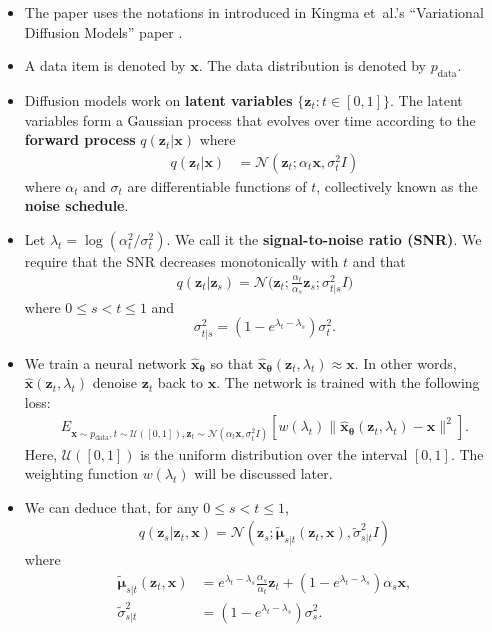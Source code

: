 \documentclass[10pt]{article}
\newcommand{\ve}[1]{\mathbf{#1}}
\newcommand{\ves}[1]{\boldsymbol{#1}}
\newcommand{\etal}{{et~al.}}
\newcommand{\mcal}[1]{\mathcal{#1}}
\newcommand{\data}{\mathrm{data}}
\begin{document}
\begin{itemize}
  \item The paper uses the notations in introduced in Kingma \etal's ``Variational Diffusion Models'' paper \cite{Kingma:2021}.
  
  \item A data item is denoted by $\ve{x}$. The data distribution is denoted by $p_{\data}$.
  
  \item Diffusion models work on {\bf latent variables} $\{ \ve{z}_t : t \in [0,1] \}$. The latent variables form a Gaussian process that evolves over time according to the {\bf forward process} $q(\ve{z}_t|\ve{x})$ where
  \begin{align*}
    q(\ve{z}_t | \ve{x}) &= \mcal{N}(\ve{z}_t; \alpha_t \ve{x}, \sigma^2_t I)    
  \end{align*}
  where $\alpha_t$ and $\sigma_t$ are differentiable functions of $t$, collectively known as the {\bf noise schedule}.

  \item Let $\lambda_t = \log (\alpha_t^2 / \sigma_t^2)$. We call it the {\bf signal-to-noise ratio (SNR)}. We require that the SNR decreases monotonically with $t$ and that  
  \begin{align*}
    q(\ve{z}_t | \ve{z}_s) = \mcal{N}\bigg(\ve{z}_t ; \frac{\alpha_t}{\alpha_s}\ve{z}_s; \sigma_{t|s}^2 I\bigg)
  \end{align*}
  where $0 \leq s < t \leq 1$ and $$\sigma_{t|s}^2 = (1 - e^{\lambda_t - \lambda_s})\sigma_t^2.$$

  \item We train a neural network $\hat{\ve{x}}_{\ves{\theta}}$ so that $\hat{\ve{x}}_{\ves{\theta}}(\ve{z}_t, \lambda_t) \approx \ve{x}$. In other words, $\hat{\ve{x}}(\ve{z}_t, \lambda_t)$ denoise $\ve{z}_t$ back to $\ve{x}$. The network is trained with the following loss:
  \begin{align*}
    E_{\ve{x} \sim p_{\data}, t \sim \mcal{U}([0,1]), \ve{z}_t \sim \mcal{N}(\alpha_t \ve{x}, \sigma^2_t I)}[w(\lambda_t)\| \hat{\ve{x}}_{\ves{\theta}}(\ve{z}_t, \lambda_t) - \ve{x} \|^2].
  \end{align*}
  Here, $\mcal{U}([0,1])$ is the uniform distribution over the interval $[0,1]$. The weighting function $w(\lambda_t)$ will be discussed later.

  \item We can deduce that, for any $0 \leq s < t \leq 1$,
  \begin{align*}
    q(\ve{z}_s | \ve{z}_t, \ve{x}) = \mcal{N}(\ve{z}_s; \tilde{\ves{\mu}}_{s|t}(\ve{z}_t, \ve{x}), \tilde{\sigma}_{s|t}^2 I)
  \end{align*}
  where
  \begin{align*}
    \tilde{\ves{\mu}}_{s|t}(\ve{z}_t, \ve{x}) &= e^{\lambda_t - \lambda_s} \frac{\alpha_s}{\alpha_t} \ve{z}_t + (1 - e^{\lambda_t - \lambda_s})\alpha_s \ve{x}, \\
    \tilde{\sigma}_{s|t}^2 &= (1 - e^{\lambda_t - \lambda_s}) \sigma_s^2.
  \end{align*}


\end{itemize}
\end{document}
